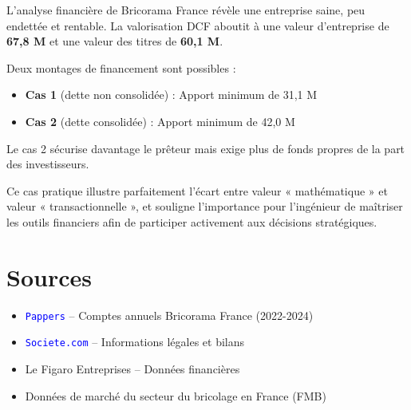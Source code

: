 \documentclass{rapportECL}
\begin{document}
L'analyse financière de Bricorama France révèle une entreprise saine, peu endettée et rentable. La valorisation DCF aboutit à une valeur d'entreprise de \textbf{67,8 M\text{\euro}} et une valeur des titres de \textbf{60,1 M\text{\euro}}.

Deux montages de financement sont possibles :
\begin{itemize}
    \item \textbf{Cas 1} (dette non consolidée) : Apport minimum de 31,1 M\text{\euro}
    \item \textbf{Cas 2} (dette consolidée) : Apport minimum de 42,0 M\text{\euro}
\end{itemize}

Le cas 2 sécurise davantage le prêteur mais exige plus de fonds propres de la part des investisseurs.

Ce cas pratique illustre parfaitement l'écart entre valeur « mathématique » et valeur « transactionnelle », et souligne l'importance pour l'ingénieur de maîtriser les outils financiers afin de participer activement aux décisions stratégiques.

\section*{Sources}

\begin{itemize}
    \item \textcolor{blue}{\texttt{Pappers}} -- Comptes annuels Bricorama France (2022-2024)
    \item \textcolor{blue}{\texttt{Societe.com}} -- Informations légales et bilans
    \item Le Figaro Entreprises -- Données financières
    \item Données de marché du secteur du bricolage en France (FMB)
\end{itemize}
\end{document}
